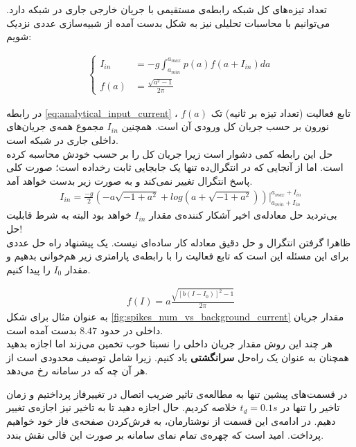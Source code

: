 تعداد تیزه‌های کل شبکه رابطه‌ی مستقیمی با جریان خارجی جاری در شبکه دارد. می‌توانیم با محاسبات تحلیلی نیز به شکل بدست آمده از شبیه‌سازی عددی نزدیک شویم:

\begin{align}
	\begin{cases}
		I_{in} &= -g \int_{a_{min}}^{a_{max}} p(a) f(a + I_{in}) da \\
		f(a) &= \frac{\sqrt{a^2 - 1}}{2\pi}
	\end{cases}
	\label{eq:analytical_input_current}
\end{align}

در رابطه \ref{eq:analytical_input_current} ، $f(a)$ تابع فعالیت (تعداد تیزه بر ثانیه) تک نورون بر حسب جریان کل ورودی آن است. همچنین $I_{in}$ مجموع همه‌ی جریان‌های داخلی جاری در شبکه است.\\

حل این رابطه کمی دشوار است زیرا جریان کل را بر حسب خودش محاسبه کرده است. اما از آنجایی که در انتگرال‌ده تنها یک جابجایی ثابت رخداده است؛ صورت کلی پاسخ انتگرال تغییر نمی‌کند و به صورت زیر بدست خواهد آمد.
\begin{align}
	I_{in} = \frac{-g}{2} (-a \sqrt{-1 + a^2} + log(a + \sqrt{-1 + a^2})) \Big|_{a_{min} + I_{in}}^{a_{max} + I_{in}}
\end{align}
بی‌تردید حل معادله‌ی اخیر آشکار کننده‌ی مقدار
$I_{in}$
خواهد بود البته به شرط قابلیت حل!\\

ظاهرا گرفتن انتگرال و حل دقیق معادله کار ساده‌ای نیست. یک پیشنهاد راه حل عددی برای این مسئله این است که تابع فعالیت را با رابطه‌ی پارامتری زیر هم‌خوانی بدهیم و مقدار 
$I_0$
را پیدا کنیم.

\begin{align}
	f(I) = a \frac{\sqrt{[b(I - I_0 )]^2 - 1}}{2\pi}
\end{align}
به عنوان مثال برای شکل
\ref{fig:spikes_num_vs_background_current}
مقدار جریان داخلی در حدود 
$8.47$
بدست آمده است.\\

هر چند این روش مقدار جریان داخلی را نسبتا خوب تخمین می‌زند اما اجازه بدهید همچنان به عنوان یک راه‌حل 
\textbf{
سرانگشتی
}
یاد کنیم. زیرا شامل توصیف محدودی است از هر آن چه که در سامانه رخ می‌دهد.

در قسمت‌های پیشین تنها به مطالعه‌ی تاثیر ضریب اتصال در تغییرفاز پرداختیم و زمان تاخیر را تنها در $t_d = 0.1 s$ خلاصه کردیم. حال اجازه دهید تا به تاخیر نیز اجازه‌ی تغییر دهیم. در ادامه‌ی این قسمت از نوشتارمان، به فرش‌کردن صفحه‌ی فاز خود خواهیم پرداخت. امید است که چهره‌ی تمام نمای سامانه‌ بر صورت این قالی نقش بندد.\\


